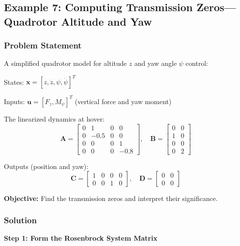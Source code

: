 \subsection{Example 7: Computing Transmission Zeros---Quadrotor Altitude and Yaw}

\subsubsection{Problem Statement}

A simplified quadrotor model for altitude $z$ and yaw angle $\psi$ control:

States: $\mathbf{x} = [z, \dot{z}, \psi, \dot{\psi}]^T$

Inputs: $\mathbf{u} = [F_z, M_\psi]^T$ (vertical force and yaw moment)

The linearized dynamics at hover:
\begin{equation}
\mathbf{A} = \begin{bmatrix} 0 & 1 & 0 & 0 \\ 0 & -0.5 & 0 & 0 \\ 0 & 0 & 0 & 1 \\ 0 & 0 & 0 & -0.8 \end{bmatrix}, \quad
\mathbf{B} = \begin{bmatrix} 0 & 0 \\ 1 & 0 \\ 0 & 0 \\ 0 & 2 \end{bmatrix}
\end{equation}

Outputs (position and yaw):
\begin{equation}
\mathbf{C} = \begin{bmatrix} 1 & 0 & 0 & 0 \\ 0 & 0 & 1 & 0 \end{bmatrix}, \quad
\mathbf{D} = \begin{bmatrix} 0 & 0 \\ 0 & 0 \end{bmatrix}
\end{equation}

\textbf{Objective:} Find the transmission zeros and interpret their significance.

\subsubsection{Solution}

\textbf{Step 1: Form the Rosenbrock System Matrix}

